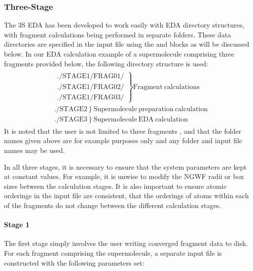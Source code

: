 \documentclass[letterpaper,10pt,english]{sphinxmanual}
\begin{document}
\subsubsection{Three-Stage}
\label{\detokenize{EDA:three-stage}}
The 3S EDA has been developed to work easily with EDA directory
structures, with fragment calculations being performed in separate
folders. These data directories are specified in the input file using
the  and  blocks as will be discussed below. In
our EDA calculation example of a supermolecule comprising three
fragments provided below, the following directory structure is used:
\begin{equation*}
\begin{split}\begin{aligned}
    &\left.
    \begin{array}{ll}
      \mathrm{./STAGE1/FRAG01/} \\
      \mathrm{./STAGE1/FRAG02/} \\
      \mathrm{./STAGE1/FRAG03/}
    \end{array}
    \right\} \mathrm{Fragment\ calculations} \nonumber \\
    &\left. \mathrm{./STAGE2} \right\} \mathrm{Supermolecule\ preparation\ calculation} \nonumber \\
    &\left. \mathrm{./STAGE3} \right\} \mathrm{Supermolecule\ EDA\ calculation} \nonumber\end{aligned}\end{split}
\end{equation*}
It is noted that the user is not limited to three fragments , and that
the folder names given above are for example purposes only and any
folder and input file names may be used.

In all three stages, it is necessary to ensure that the system
parameters are kept at constant values. For example, it is unwise to
modify the NGWF radii or box sizes between the calculation stages. It is
also important to ensure atomic orderings in the input file are
consistent,  that the orderings of atoms within each of the
fragments do not change between the different calculation stages.


\paragraph{Stage 1}
\label{\detokenize{EDA:stage-1}}
The first stage simply involves the user writing converged fragment data
to disk. For each fragment comprising the supermolecule, a separate
input file is constructed with the following parameters set:
\end{document}
